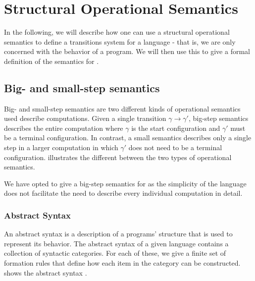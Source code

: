 \section{Structural Operational Semantics}
In the following, we will describe how one can use a structural operational semantics to define a transitions system for a language - that is, we are only concerned with the behavior of a program.
We will then use this to give a formal definition of the semantics for \dazel{}.

\subsection{Big- and small-step semantics}
Big- and small-step semantics are two different kinds of operational semantics used describe computations.
Given a single transition $\gamma \rightarrow \gamma' $, big-step semantics describes the entire computation where $\gamma$ is the start configuration and $\gamma'$ must be a terminal configuration. 
In contrast, a small semantics describes only a single step in a larger computation in which $\gamma'$ does not need to be a terminal configuration. 
 illustrates the different between the two types of operational semantics\cite{huttelTransitionsTreesIntroduction2010}.


We have opted to give a big-step semantics for \dazel{} as the simplicity of the language does not facilitate the need to describe every individual computation in detail.  
\subsubsection*{Abstract Syntax}
An abstract syntax is a description of a programs' structure that is used to represent its behavior. 
The abstract syntax of a given language contains a collection of syntactic categories. 
For each of these, we give a finite set of formation rules that define how each item in the category can be constructed.
 shows the abstract syntax \dazel{}.





